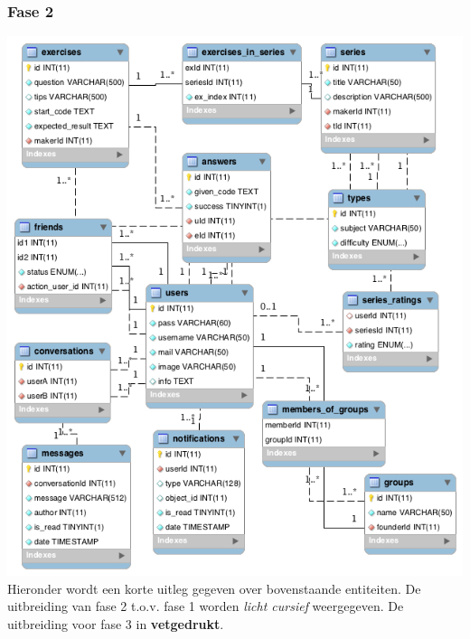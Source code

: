 \subsubsection{Fase 2}
\mbox{\hspace{-6ex}\includegraphics[keepaspectratio=true, scale=0.6]{raport_files/design/UML2.png}}\\
\small Hieronder wordt een korte uitleg gegeven over bovenstaande entiteiten. De uitbreiding van fase 2 t.o.v. fase 1
worden \textsl{licht cursief} weergegeven. De uitbreiding voor fase 3 in \textbf{vetgedrukt}.
\normalsize
